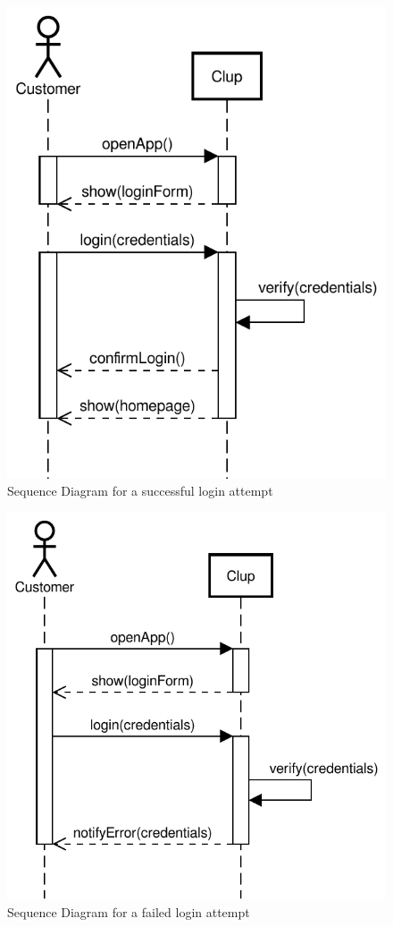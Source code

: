 \begin{figure}[H]
    \centering
    \includegraphics[scale=0.9]{Images/Sequence/login-account_sequence_straight.pdf}
    \caption{Sequence Diagram for a successful login attempt}
\end{figure}
\begin{figure}[H]
    \centering
    \includegraphics[scale=0.9]{Images/Sequence/failedlogin-account_sequence_straight.pdf}
    \caption{Sequence Diagram for a failed login attempt}
\end{figure}
